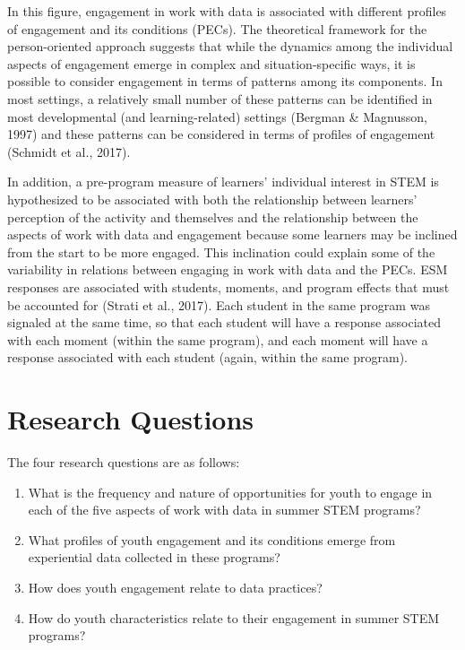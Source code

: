\documentclass[]{msu-thesis}
\providecommand{\tightlist}{%
  \setlength{\itemsep}{0pt}\setlength{\parskip}{0pt}}
\theoremstyle{definition}
\theoremstyle{definition}
\theoremstyle{definition}
\theoremstyle{remark}
\begin{document}
In this figure, engagement in work with data is associated with
different profiles of engagement and its conditions (PECs). The
theoretical framework for the person-oriented approach suggests that
while the dynamics among the individual aspects of engagement emerge in
complex and situation-specific ways, it is possible to consider
engagement in terms of patterns among its components. In most settings,
a relatively small number of these patterns can be identified in most
developmental (and learning-related) settings (Bergman \& Magnusson,
1997) and these patterns can be considered in terms of profiles of
engagement (Schmidt et al., 2017).

In addition, a pre-program measure of learners' individual interest in
STEM is hypothesized to be associated with both the relationship between
learners' perception of the activity and themselves and the relationship
between the aspects of work with data and engagement because some
learners may be inclined from the start to be more engaged. This
inclination could explain some of the variability in relations between
engaging in work with data and the PECs. ESM responses are associated
with students, moments, and program effects that must be accounted for
(Strati et al., 2017). Each student in the same program was signaled at
the same time, so that each student will have a response associated with
each moment (within the same program), and each moment will have a
response associated with each student (again, within the same program).

\section{Research Questions}\label{research-questions}

The four research questions are as follows:

\begin{enumerate}
\def\labelenumi{\arabic{enumi}.}
\tightlist
\item
  What is the frequency and nature of opportunities for youth to engage
  in each of the five aspects of work with data in summer STEM programs?
\item
  What profiles of youth engagement and its conditions emerge from
  experiential data collected in these programs?
\item
  How does youth engagement relate to data practices?
\item
  How do youth characteristics relate to their engagement in summer STEM
  programs?
\end{enumerate}
\end{document}
